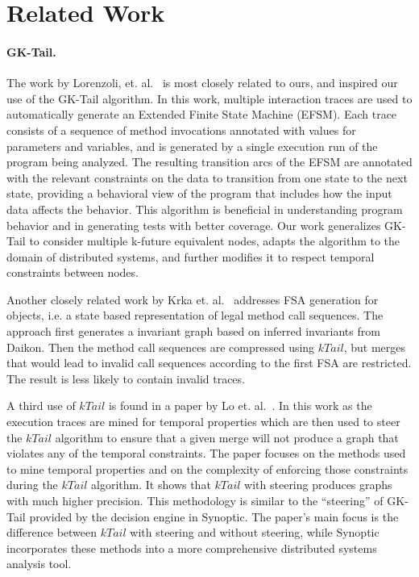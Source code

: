 \section{Related Work}
\label{sec:related}

\paragraph{GK-Tail.} The work by Lorenzoli, et. al.~\cite{AGSBM} is
most closely related to ours, and inspired our use of the GK-Tail
algorithm. In this work, multiple interaction traces are used to
automatically generate an Extended Finite State Machine (EFSM). Each
trace consists of a sequence of method invocations annotated with
values for parameters and variables, and is generated by a single
execution run of the program being analyzed.  The resulting transition
arcs of the EFSM are annotated with the relevant constraints on the
data to transition from one state to the next state, providing a
behavioral view of the program that includes how the input data
affects the behavior. This algorithm is beneficial in understanding
program behavior and in generating tests with better coverage. Our
work generalizes GK-Tail to consider multiple k-future equivalent
nodes, adapts the algorithm to the domain of distributed systems, and
further modifies it to respect temporal constraints between nodes.

Another closely related work by Krka et. al.~\cite{Krka10icse-nier}
addresses FSA generation for objects, i.e. a state based representation
of legal method call sequences. The approach first generates a
invariant graph based on inferred invariants from Daikon. Then the
method call sequences are compressed using $kTail$, but merges that
would lead to invalid call sequences according to the first FSA are
restricted. The result is less likely to contain invalid traces.

A third use of $kTail$ is found in a paper by Lo
et. al.~\cite{ASBMI}. In this work as the execution traces are mined
for temporal properties which are then used to steer the $kTail$
algorithm to ensure that a given merge will not produce a graph that
violates any of the temporal constraints. The paper focuses on the
methods used to mine temporal properties and on the complexity of
enforcing those constraints during the $kTail$ algorithm. It shows
that $kTail$ with steering produces graphs with much higher precision.
This methodology is similar to the ``steering'' of GK-Tail provided by
the decision engine in Synoptic. The paper's main focus is the
difference between $kTail$ with steering and without steering, while
Synoptic incorporates these methods into a more comprehensive
distributed systems analysis tool.

